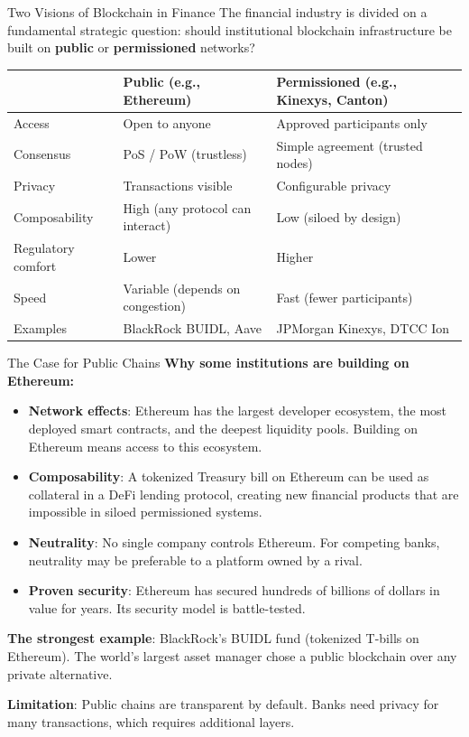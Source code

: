 \documentclass[10pt]{beamer}
\newcommand{\highlight}[1]{\textcolor{AccentOrange}{\textbf{#1}}}
\begin{document}
\begin{frame}{Two Visions of Blockchain in Finance}
  The financial industry is divided on a fundamental strategic question: should institutional blockchain infrastructure be built on \highlight{public} or \highlight{permissioned} networks?
  
  \begin{center}
    \small
    \begin{tabular}{p{2cm}p{4cm}p{4cm}}
      \toprule
      & \textbf{Public} (e.g., Ethereum) & \textbf{Permissioned} (e.g., Kinexys, Canton) \\
      \midrule
      Access & Open to anyone & Approved participants only \\
      Consensus & PoS / PoW (trustless) & Simple agreement (trusted nodes) \\
      Privacy & Transactions visible & Configurable privacy \\
      Composability & High (any protocol can interact) & Low (siloed by design) \\
      Regulatory comfort & Lower & Higher \\
      Speed & Variable (depends on congestion) & Fast (fewer participants) \\
      Examples & BlackRock BUIDL, Aave & JPMorgan Kinexys, DTCC Ion \\
      \bottomrule
    \end{tabular}
  \end{center}
\end{frame}

\begin{frame}{The Case for Public Chains}
  \textbf{Why some institutions are building on Ethereum:}
  \begin{itemize}
    \item \textbf{Network effects}: Ethereum has the largest developer ecosystem, the most deployed smart contracts, and the deepest liquidity pools. Building on Ethereum means access to this ecosystem.
    \item \textbf{Composability}: A tokenized Treasury bill on Ethereum can be used as collateral in a DeFi lending protocol, creating new financial products that are impossible in siloed permissioned systems.
    \item \textbf{Neutrality}: No single company controls Ethereum. For competing banks, neutrality may be preferable to a platform owned by a rival.
    \item \textbf{Proven security}: Ethereum has secured hundreds of billions of dollars in value for years. Its security model is battle-tested.
  \end{itemize}
  
  \vspace{0.5em}
  \textbf{The strongest example}: BlackRock's BUIDL fund (tokenized T-bills on Ethereum). The world's largest asset manager chose a public blockchain over any private alternative.
  
  \vspace{0.3em}
  \textbf{Limitation}: Public chains are transparent by default. Banks need privacy for many transactions, which requires additional layers.
\end{frame}
\end{document}
